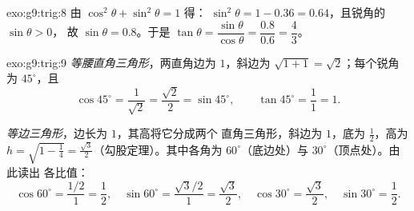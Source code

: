 \begin{solution}{exo:g9:trig:8}
由 $\cos^2\theta + \sin^2\theta = 1$ 得：
$\sin^2\theta = 1 - 0.36 = 0.64$，且锐角的 $\sin\theta > 0$，
故 $\sin\theta = 0.8$。于是
$\tan\theta = \dfrac{\sin\theta}{\cos\theta} = \dfrac{0.8}{0.6} =
\dfrac43$。
\end{solution}

\begin{solution}{exo:g9:trig:9}
\emph{等腰直角三角形}，两直角边为 $1$，斜边为
$\sqrt{1 + 1} = \sqrt2$；每个锐角为 $45^\circ$，且
\[
\cos 45^\circ = \frac{1}{\sqrt2} = \frac{\sqrt2}{2} = \sin 45^\circ,
\qquad
\tan 45^\circ = \frac11 = 1 .
\]

\emph{等边三角形}，边长为 $1$，其高将它分成两个
直角三角形，斜边为 $1$，底为 $\frac12$，高为
$h = \sqrt{1 - \frac14} = \frac{\sqrt3}{2}$（勾股定理）。其中各角为
$60^\circ$（底边处）与 $30^\circ$（顶点处）。由此读出
各比值：
\[
\cos 60^\circ = \frac{1/2}{1} = \frac12, \quad
\sin 60^\circ = \frac{\sqrt3/2}{1} = \frac{\sqrt3}{2}, \quad
\cos 30^\circ = \frac{\sqrt3}{2}, \quad
\sin 30^\circ = \frac12 .
\]
\end{solution}

